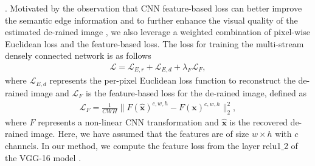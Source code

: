 \documentclass[10pt,twocolumn,letterpaper]{article}
\begin{document}
 
. Motivated by the observation that CNN feature-based loss can better improve the semantic edge information  \cite{perceptual_loss,SR_photorea} and to further enhance the visual quality of the estimated de-rained image \cite{derain_2017_zhang}, we also leverage a weighted combination of pixel-wise Euclidean loss and the feature-based loss. The loss for training the multi-stream densely connected network is as follows
 \begin{equation}
 \label{eq:loss_all}
 \begin{split}
 \mathcal{L}= \mathcal{L}_{E,r}+ \mathcal{L}_{E,d}+  \lambda_F\mathcal{L}_F,
 \end{split}
  \end{equation}
where $\mathcal{L}_{E,d}$ represents the per-pixel Euclidean loss function to reconstruct the de-rained image and  $\mathcal{L}_F$ is the feature-based loss for the de-rained image, defined as
 \begin{equation}\label{eq:perc_loss}
 \begin{split}
 \mathcal{L}_F= \frac{1}{CWH} \|F(\mathbf{\hat{x}})^{c,w,h}-F
 (\mathbf{x})^{c,w,h}\|_2^2,
 \end{split}
 \end{equation}
 where $F$ represents a non-linear CNN transformation and $\hat{\mathbf{x}}$ is the recovered de-rained image. Here, we have assumed that the features are of size $w\times h$ with $c$  channels.  In our method, we compute the feature loss from the layer relu1$\_$2 of the VGG-16 model \cite{vgg}.
 
\begin{table*}[htp!]
	\centering
	\caption{Quantitative results evaluated in terms of average SSIM and PSNR (dB) (SSIM/PSNR).}
		\label{ta:quantitive}
\end{table*}
 
\end{document}
